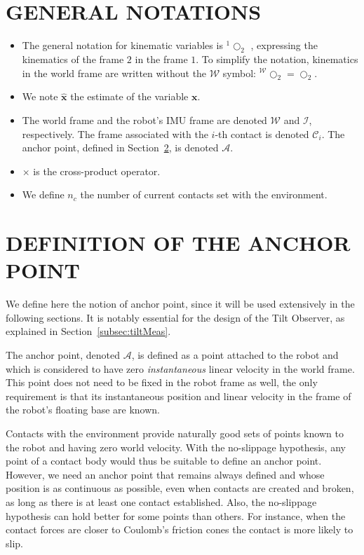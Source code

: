 \documentclass{IJCAS}
\begin{document}
\section{GENERAL NOTATIONS}
\begin{itemize}
    \item The general notation for kinematic variables is $^{1}\bigcirc_{2}$ , expressing the kinematics of the frame $2$ in the frame $1$. To simplify the notation, kinematics in the world frame are written without the $\mathcal{W}$ symbol: $^{\mathcal{W}}\bigcirc_{2}=\bigcirc_{2}$.
    \item We note $\hat{\boldsymbol{x}}$ the estimate of the variable $\boldsymbol{x}$.
    \item The world frame and the robot's IMU frame are denoted $\mathcal{W}$ and $\mathcal{I}$, respectively. The frame associated with the $i$-th contact is denoted $\mathcal{C}_{i}$. The anchor point, defined in Section~\ref{sec:anchor_point}, is denoted $\mathcal{A}$. 
    \item $\times$ is the cross-product operator. 
    \item We define $n_c$ the number of current contacts set with the environment.
    
\end{itemize} 



\section{DEFINITION OF THE ANCHOR POINT}\label{sec:anchor_point}
We define here the notion of anchor point, since it will be used extensively in the following sections. It is notably essential for the design of the Tilt Observer, as explained in Section~\ref{subsec:tiltMeas}.

The anchor point, denoted $\mathcal{A}$, is defined as a point attached to the robot and which is considered to have zero \emph{instantaneous} linear velocity in the world frame. This point does not need to be fixed in the robot frame as well, the only requirement is that its instantaneous position and linear velocity in the frame of the robot's floating base are known. 

Contacts with the environment provide naturally good sets of points known to the robot and having zero world velocity. With the no-slippage hypothesis, any point of a contact body would thus be suitable to define an anchor point. However, we need an anchor point that remains always defined and whose position is as continuous as possible, even when contacts are created and broken, as long as there is at least one contact established. Also, the no-slippage hypothesis can hold better for some points than others. For instance, when the contact forces are closer to Coulomb's friction cones the contact is more likely to slip.
\end{document}
